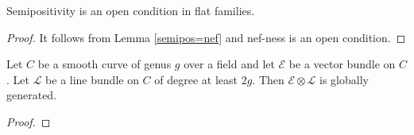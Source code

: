 \begin{lemma}
Semipositivity is an open condition in flat families.
\end{lemma}

\begin{proof}
It follows from Lemma \ref{semipos=nef} and nef-ness is an open condition.
\end{proof}

\begin{lemma}\label{global_generation_of_specific_twist_on_curve}
Let $C$ be a smooth curve of genus $g$ over a field and let $\mathcal{E}$ be a vector bundle on $C$. Let $\mathcal{L}$ be a line bundle on $C$ of degree at least $2g$. Then $\mathcal{E}\otimes\mathcal{L}$ is globally generated.
\end{lemma}

\begin{proof}

\end{proof}


